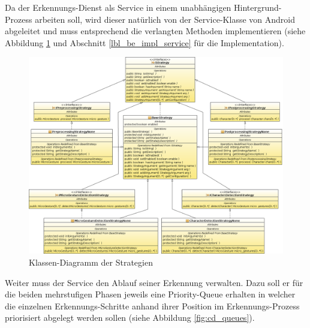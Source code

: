 Da der Erkennungs-Dienst als Service in einem unabhängigen Hintergrund-Prozess arbeiten soll, wird dieser natürlich von der Service-Klasse von Android abgeleitet und muss entsprechend die verlangten Methoden implementieren  (siehe Abbildung \ref{fig:cd_strategies} und Abschnitt \ref{lbl_be_impl_service} für die Implementation).

\begin{figure}[bh!]
   \centering
   \includegraphics[width=\textwidth]{img/uml_cd_strategies} 
   \caption{Klassen-Diagramm der Strategien}
   \label{fig:cd_strategies}
\end{figure}

Weiter muss der Service den Ablauf seiner Erkennung verwalten. Dazu soll er für die beiden mehrstufigen Phasen jeweils eine Priority-Queue erhalten in welcher die einzelnen Erkennungs-Schritte anhand ihrer Position im Erkennungs-Prozess priorisiert abgelegt werden sollen (siehe Abbildung \ref{fig:cd_queues}).

